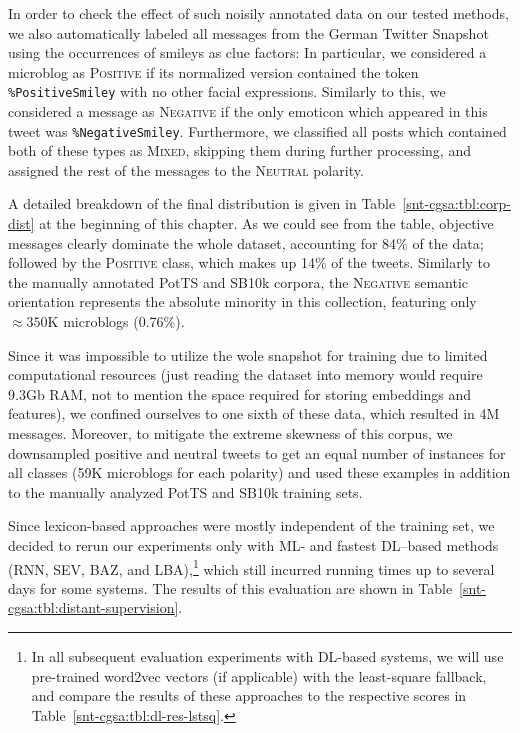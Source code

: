 In order to check the effect of such noisily annotated data on our
tested methods, we also automatically labeled all messages from the
German Twitter Snapshot~\cite{Scheffler:14} using the occurrences of
smileys as clue factors: In particular, we considered a microblog as
\textsc{Positive} if its normalized version contained the token
\texttt{\%PositiveSmiley} with no other facial expressions.  Similarly
to this, we considered a message as \textsc{Negative} if the only
emoticon which appeared in this tweet was \texttt{\%NegativeSmiley}.
Furthermore, we classified all posts which contained both of these
types as \textsc{Mixed}, skipping them during further processing, and
assigned the rest of the messages to the \textsc{Neutral} polarity.

A detailed breakdown of the final distribution is given in
Table~\ref{snt-cgsa:tbl:corp-dist} at the beginning of this
chapter. As we could see from the table, objective messages clearly
dominate the whole dataset, accounting for 84\% of the data; followed
by the \textsc{Positive} class, which makes up 14\% of the tweets.
Similarly to the manually annotated PotTS and SB10k corpora, the
\textsc{Negative} semantic orientation represents the absolute
minority in this collection, featuring only $\approx 350$K microblogs
(0.76\%).

Since it was impossible to utilize the wole snapshot for training due
to limited computational resources (just reading the dataset into
memory would require 9.3Gb RAM, not to mention the space required for
storing embeddings and features), we confined ourselves to one sixth
of these data, which resulted in 4M messages.  Moreover, to mitigate
the extreme skewness of this corpus, we downsampled positive and
neutral tweets to get an equal number of instances for all classes
(59K microblogs for each polarity) and used these examples in addition
to the manually analyzed PotTS and SB10k training sets.

Since lexicon-based approaches were mostly independent of the training
set, we decided to rerun our experiments only with ML- and fastest
DL--based methods (RNN, SEV, BAZ, and LBA),\footnote{In all subsequent
  evaluation experiments with DL-based systems, we will use
  pre-trained word2vec vectors (if applicable) with the least-square
  fallback, and compare the results of these approaches to the
  respective scores in Table~\ref{snt-cgsa:tbl:dl-res-lstsq}.} which
still incurred running times up to several days for some systems.  The
results of this evaluation are shown in
Table~\ref{snt-cgsa:tbl:distant-supervision}.

